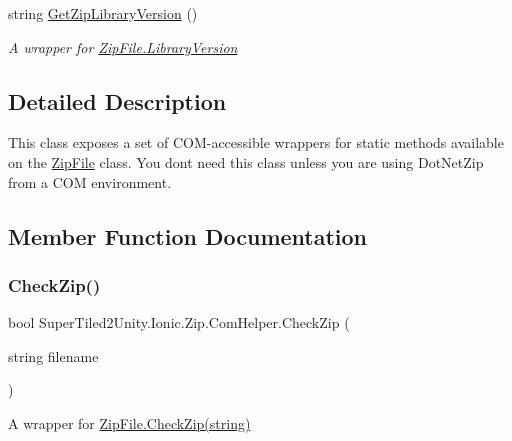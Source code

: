 \begin{DoxyCompactItemize}
string \mbox{\hyperlink{class_super_tiled2_unity_1_1_ionic_1_1_zip_1_1_com_helper_a32cc8afaeb0291f0ed3f84a3082ac056}{Get\+Zip\+Library\+Version}} ()
\begin{DoxyCompactList}\small\item\em A wrapper for \mbox{\hyperlink{class_super_tiled2_unity_1_1_ionic_1_1_zip_1_1_zip_file_ac9c12c0e7927c8d1fff6abd5f80e1125}{Zip\+File.\+Library\+Version}} \end{DoxyCompactList}\end{DoxyCompactItemize}


\subsection{Detailed Description}
This class exposes a set of C\+O\+M-\/accessible wrappers for static methods available on the \mbox{\hyperlink{class_super_tiled2_unity_1_1_ionic_1_1_zip_1_1_zip_file}{Zip\+File}} class. You don\textquotesingle{}t need this class unless you are using Dot\+Net\+Zip from a C\+OM environment. 



\subsection{Member Function Documentation}
\mbox{\label{class_super_tiled2_unity_1_1_ionic_1_1_zip_1_1_com_helper_a64912ff468b1469ad32718b6f8b5dda4}} 
\subsubsection{\texorpdfstring{Check\+Zip()}{CheckZip()}}
{\footnotesize\ttfamily bool Super\+Tiled2\+Unity.\+Ionic.\+Zip.\+Com\+Helper.\+Check\+Zip (\begin{DoxyParamCaption}\item[{string}]{filename }\end{DoxyParamCaption})}



A wrapper for \mbox{\hyperlink{class_super_tiled2_unity_1_1_ionic_1_1_zip_1_1_zip_file_a25223986c875661870fa62d08d68ef45}{Zip\+File.\+Check\+Zip(string)}} 


